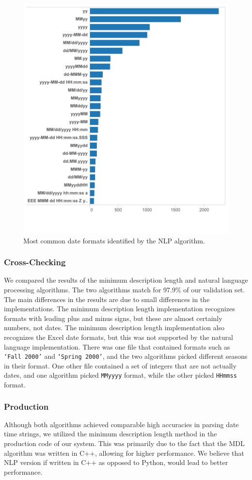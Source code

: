 \begin{figure}[ht]
\centering
\includegraphics[width=\columnwidth]{figures/FigureNLP1}
\caption{Most common date formats identified by the NLP algorithm.}
\label{fig:NLP1}
\end{figure}

\subsubsection{Cross-Checking}
We compared the results of the minimum description length and natural language processing algorithms. The two algorithms match for 97.9\% of our validation set. The main differences in the results are due to small differences in the implementations. The minimum description length implementation recognizes formats with leading plus and minus signs, but these are almost certainly numbers, not dates. The minimum description length implementation also recognizes the Excel date formats, but this was not supported by the natural language implementation. There was one file that contained formats such as \texttt{`Fall 2000'} and \texttt{`Spring 2000'}, and the two algorithms picked different seasons in their format. One other file contained a set of integers that are not actually dates, and one algorithm picked \texttt{MMyyyy} format, while the other picked \texttt{HHmmss} format.

\subsubsection{Production}

Although both algorithms achieved comparable high accuracies in parsing date time strings, we utilized the minimum description length method in the production code of our system. This was primarily due to the fact that the MDL algorithm was written in C++, allowing for higher performance. We believe that NLP version if written in C++ as opposed to Python, would lead to better performance. 